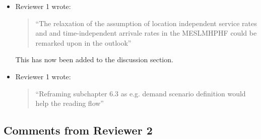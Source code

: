 \documentclass{article}
\begin{document}
\begin{itemize}
\item Reviewer 1 wrote:
\begin{quote}
``The relaxation of the assumption of location independent service rates and and time-independent arrivale rates in the MESLMHPHF could be remarked upon in the outlook''
\end{quote}
This has now been added to the discussion section.

\item Reviewer 1 wrote:
\begin{quote}
``Reframing subchapter 6.3 as e.g. demand scenario definition would help the reading flow''
\end{quote}

\end{itemize}

\subsection{Comments from Reviewer 2}
\end{document}
